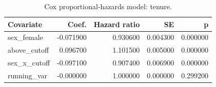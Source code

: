 \begin{table}[htbp]
\centering
\begin{tabular}{lrrrr}
\toprule
Covariate & Coef. & Hazard ratio & SE & p \\
\midrule
sex_female & -0.071900 & 0.930600 & 0.004300 & 0.000000 \\
above_cutoff & 0.096700 & 1.101500 & 0.005000 & 0.000000 \\
sex_x_cutoff & -0.097100 & 0.907400 & 0.006900 & 0.000000 \\
running_var & -0.000000 & 1.000000 & 0.000000 & 0.299200 \\
\bottomrule
\end{tabular}

\caption{Cox proportional-hazards model: tenure.}
\label{tab:cox}
\end{table}
